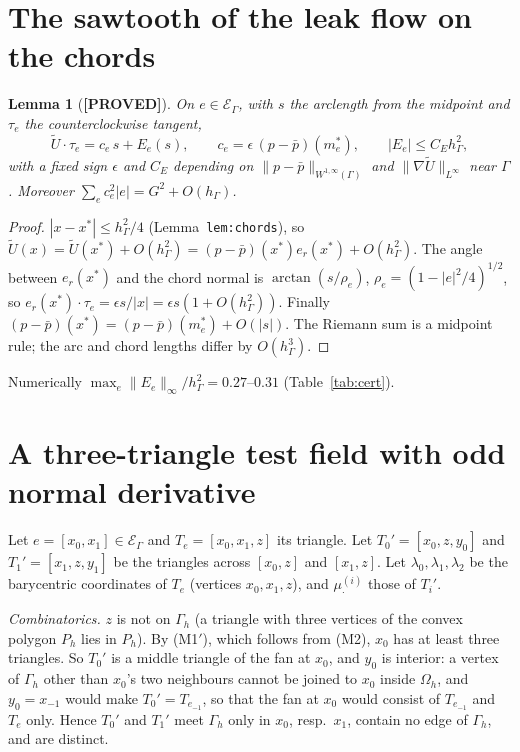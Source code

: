 \documentclass[11pt]{article}
\newtheorem{lemma}[theorem]{Lemma}
\theoremstyle{remark}
\newcommand{\hG}{h_\Gamma}
\newcommand{\Gh}{\Gamma_h}
\newcommand{\Oh}{\Omega_h}
\newcommand{\norm}[1]{\|#1\|}
\newcommand{\Ut}{\tilde U}
\newcommand{\pbar}{\bar p}
\newcommand{\lab}[1]{\textbf{[#1]}}
\newcommand{\EG}{\mathcal E_\Gamma}
\begin{document}
\section{The sawtooth of the leak flow on the chords}
\begin{lemma}[\lab{PROVED}]\label{lem:exp}
On $e\in\EG$, with $s$ the arclength from the midpoint and $\tau_e$ the counterclockwise tangent,
\[
\Ut\cdot\tau_e=c_e\,s+E_e(s),\qquad c_e=\epsilon\,(p-\pbar)(m_e^\ast),\qquad |E_e|\le C_E\hG^2,
\]
with a fixed sign $\epsilon$ and $C_E$ depending on $\norm{p-\pbar}_{W^{1,\infty}(\Gamma)}$ and $\norm{\nabla\Ut}_{L^\infty}$ near $\Gamma$. Moreover $\sum_ec_e^2|e|=G^2+O(\hG)$.
\end{lemma}
\begin{proof}
$|x-x^\ast|\le\hG^2/4$ (Lemma~\texttt{lem:chords}), so $\Ut(x)=\Ut(x^\ast)+O(\hG^2)=(p-\pbar)(x^\ast)e_r(x^\ast)+O(\hG^2)$. The angle between $e_r(x^\ast)$ and the chord normal is $\arctan(s/\rho_e)$, $\rho_e=(1-|e|^2/4)^{1/2}$, so $e_r(x^\ast)\cdot\tau_e=\epsilon s/|x|=\epsilon s(1+O(\hG^2))$. Finally $(p-\pbar)(x^\ast)=(p-\pbar)(m_e^\ast)+O(|s|)$. The Riemann sum is a midpoint rule; the arc and chord lengths differ by $O(\hG^3)$.
\end{proof}
Numerically $\max_e\norm{E_e}_\infty/\hG^2=0.27$--$0.31$ (Table~\ref{tab:cert}).

\section{A three-triangle test field with odd normal derivative}
Let $e=[x_0,x_1]\in\EG$ and $T_e=[x_0,x_1,z]$ its triangle. Let $T_0'=[x_0,z,y_0]$ and $T_1'=[x_1,z,y_1]$ be the triangles across $[x_0,z]$ and $[x_1,z]$. Let $\lambda_0,\lambda_1,\lambda_2$ be the barycentric coordinates of $T_e$ (vertices $x_0,x_1,z$), and $\mu^{(i)}_{\cdot}$ those of $T_i'$.

\emph{Combinatorics.} $z$ is not on $\Gh$ (a triangle with three vertices of the convex polygon $P_h$ lies in $P_h$). By (M1$'$), which follows from (M2), $x_0$ has at least three triangles. So $T_0'$ is a middle triangle of the fan at $x_0$, and $y_0$ is interior: a vertex of $\Gh$ other than $x_0$'s two neighbours cannot be joined to $x_0$ inside $\Oh$, and $y_0=x_{-1}$ would make $T_0'=T_{e_{-1}}$, so that the fan at $x_0$ would consist of $T_{e_{-1}}$ and $T_e$ only. Hence $T_0'$ and $T_1'$ meet $\Gh$ only in $x_0$, resp.\ $x_1$, contain no edge of $\Gh$, and are distinct.
\end{document}
